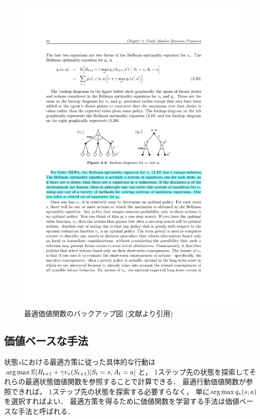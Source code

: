 \begin{figure}[h]
  \centering
  \includegraphics[width=\linewidth{}]{figures/backup.pdf}
  \caption{最適価値関数のバックアップ図 (文献\cite{Sutton1998}より引用) \label{fig:backup}}
\end{figure}

\subsection{価値ベースな手法}
状態$s$における最適方策に従った具体的な行動は$\operatorname*{arg\,max} \mathbb{E}[R_{t+1} + \gamma v_*(S_{t+1}) | S_t=s, A_t=a]$と， $1$ステップ先の状態を探索してそれらの最適状態価値関数を参照することで計算できる．
最適行動価値関数が参照できれば， $1$ステップ先の状態を探索する必要すらなく， 単に$\operatorname*{arg\,max} q_*(s, a)$を選択すればよい．
最適方策を得るために価値関数を学習する手法は価値ベースな手法と呼ばれる．


